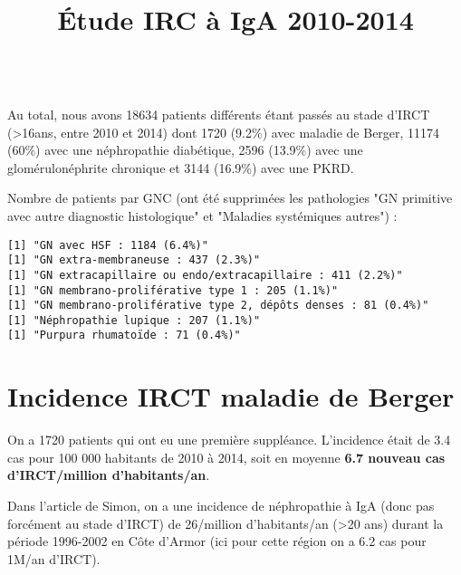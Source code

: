 \documentclass[11pt,a4paper]{article}\usepackage[]{graphicx}\usepackage[]{color}
\title{Étude IRC à IgA 2010-2014}
\makeatletter
\newenvironment{kframe}{%
 \def\at@end@of@kframe{}%
 \ifinner\ifhmode%
  \def\at@end@of@kframe{\end{minipage}}%
  \begin{minipage}{\columnwidth}%
 \fi\fi%
 \def\FrameCommand##1{\hskip\@totalleftmargin \hskip-\fboxsep
 \colorbox{shadecolor}{##1}\hskip-\fboxsep
     \hskip-\linewidth \hskip-\@totalleftmargin \hskip\columnwidth}%
 \MakeFramed {\advance\hsize-\width
   \@totalleftmargin\z@ \linewidth\hsize
   \@setminipage}}%
 {\par\unskip\endMakeFramed%
 \at@end@of@kframe}
\newenvironment{knitrout}{}{} %
\makeatother
\begin{document}
\maketitle

\tableofcontents
~\\























Au total, nous avons 18634 patients différents étant passés au stade d'IRCT (\textgreater 16ans, entre 2010 et 2014) dont 1720 (9.2\%) avec maladie de Berger, 11174 (60\%) avec une néphropathie diabétique, 2596 (13.9\%) avec une glomérulonéphrite chronique et 3144 (16.9\%) avec une PKRD.

Nombre de patients par GNC (ont été supprimées les pathologies "GN primitive avec autre diagnostic histologique" et "Maladies systémiques autres") :

\begin{knitrout}
\color{fgcolor}\begin{kframe}
\begin{verbatim}
[1] "GN avec HSF : 1184 (6.4%)"
[1] "GN extra-membraneuse : 437 (2.3%)"
[1] "GN extracapillaire ou endo/extracapillaire : 411 (2.2%)"
[1] "GN membrano-proliférative type 1 : 205 (1.1%)"
[1] "GN membrano-proliférative type 2, dépôts denses : 81 (0.4%)"
[1] "Néphropathie lupique : 207 (1.1%)"
[1] "Purpura rhumatoïde : 71 (0.4%)"
\end{verbatim}
\end{kframe}
\end{knitrout}

\section{Incidence IRCT maladie de Berger}



On a 1720 patients qui ont eu une première suppléance. L'incidence était de 3.4 cas pour 100 000 habitants de 2010 à 2014, soit en moyenne \textbf{6.7 nouveau cas d'IRCT/million d'habitants/an}. 

Dans l'article de Simon, on a une incidence de néphropathie à IgA (donc pas forcément au stade d'IRCT) de 26/million d'habitants/an (\textgreater 20 ans) durant la période 1996-2002 en Côte d'Armor (ici pour cette région on a 6.2 cas pour 1M/an d'IRCT). %
\end{document}
